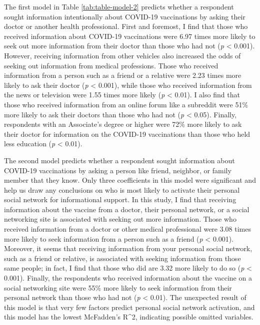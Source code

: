 The first model in Table \ref{tab:table-model-2} predicts whether a
respondent sought information intentionally about COVID-19 vaccinations by
asking their doctor or another health professional. First and foremost, I find
that those who received information about COVID-19 vaccinations were
6.97 times more likely to seek out more information from their doctor than those who had
not (\emph{p} \textless{} 0.001). However, receiving information from other vehicles also
increased the odds of seeking out information from medical professions. Those who
received information from a person such as a friend or a relative were
2.23 times more likely to ask their doctor (\emph{p} \textless{} 0.001), while those who received
information from the news or television were 1.55 times more likely (\emph{p} \textless{} 0.01). 
I also find that those who received information from an online forum like a subreddit were 51\% 
more likely to ask their doctors than those who had not (\emph{p} \textless{} 0.05). 
Finally, respondents with an Associate's degree or higher were 72\%
more likely to ask their doctor for information on the COVID-19 vaccinations
than those who held less education (\emph{p} \textless{} 0.01).

The second model predicts whether a respondent sought information about
COVID-19 vaccinations by asking a person like friend, neighbor, or family member
that they know. Only three coefficients in this model were significant and help
us draw any conclusions on who is most likely to activate their personal social
network for informational support. In this study, I find that receiving
information about the vaccine from a doctor, their personal network, or a social
networking site is associated with seeking out more information. Those who
received information from a doctor or other medical professional were 3.08
times more likely to seek information from a person such as a friend (\emph{p} \textless{} 0.001).
Moreover, it seems that receiving information from your personal social network,
such as a friend or relative, is associated with seeking information from those
same people; in fact, I find that those who did are 3.32 more
likely to do so (\emph{p} \textless{} 0.001). Finally, the respondents who received information
about the vaccine on a social networking site were 55\%
more likely to seek information from their personal network than those who had not
(\emph{p} \textless{} 0.01). The unexpected result of this model is that very few factors predict
personal social network activation, and this model has the lowest McFadden's R\^{}2,
indicating possible omitted variables.

